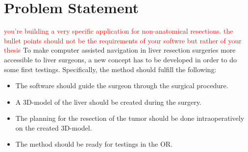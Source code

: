 \chapter{Problem Statement}
\textcolor{red}{ you're building a very specific application for non-anatomical resections. the bullet points should not be the requirements of your softwre but rather of your thesis}
To make computer assisted navigation in liver resection surgeries more
accessible to liver surgeons, a new concept has to be developed in order to do
some first testings.
Specifically, the method should fulfill the following:
\begin{itemize}
  \item The software should guide the surgeon through the surgical procedure.
  \item A 3D-model of the liver should be created during the surgery.
  \item The planning for the resection of the tumor should be done
    intraoperatively on the created 3D-model.
  \item The method should be ready for testings in the OR.
\end{itemize}
\endinput
